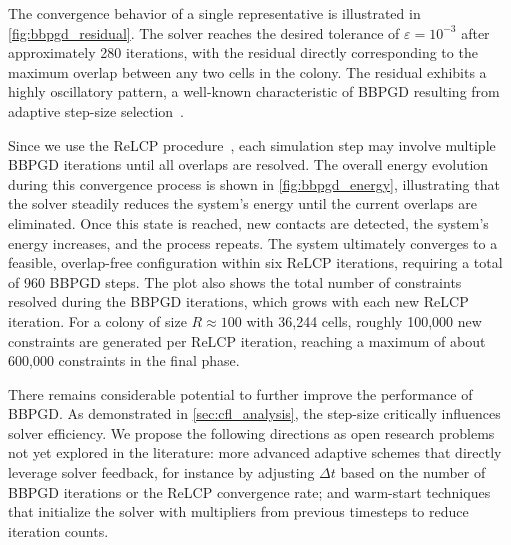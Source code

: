 \documentclass[a4paper,fleqn]{cas-dc}
\providecommand{\DIFaddtex}[1]{\highLight[diffaddbg]{#1}} %
\providecommand{\DIFdeltex}[1]{\highLight[diffdelbg]{\textcolor{diffdelfg}{\strikeThrough{#1}}}} %
\providecommand{\DIFaddbegin}{} %
\providecommand{\DIFaddend}{} %
\providecommand{\DIFdelbegin}{} %
\providecommand{\DIFdelend}{} %
\providecommand{\DIFaddtex}[1]{\texorpdfstring{\DIFaddtex{#1}}{#1}} %
\providecommand{\DIFdeltex}[1]{\texorpdfstring{\DIFdeltex{#1}}{}} %
\providecommand{\DIFadd}[1]{\texorpdfstring{\DIFaddtex{#1}}{#1}} %
\providecommand{\DIFdel}[1]{\texorpdfstring{\DIFdeltex{#1}}{}} %
\newcommand{\DIFscaledelfig}{0.5}
\newlength{\DIFdelgraphicswidth} %
\newlength{\DIFdelgraphicsheight} %
\newcommand{\DIFaddincludegraphics}[2][]{{\color{blue}\fbox{\DIFOincludegraphics[#1]{#2}}}} %
\newcommand{\DIFdelincludegraphics}[2][]{%
\sbox{\DIFdelgraphicsbox}{\DIFOincludegraphics[#1]{#2}}%
\settoboxwidth{\DIFdelgraphicswidth}{\DIFdelgraphicsbox} %
\settoboxtotalheight{\DIFdelgraphicsheight}{\DIFdelgraphicsbox} %
\scalebox{\DIFscaledelfig}{%
\parbox[b]{\DIFdelgraphicswidth}{\usebox{\DIFdelgraphicsbox}\\[-\baselineskip] \rule{\DIFdelgraphicswidth}{0em}}\llap{\resizebox{\DIFdelgraphicswidth}{\DIFdelgraphicsheight}{%
\setlength{\unitlength}{\DIFdelgraphicswidth}%
\begin{picture}(1,1)%
\thicklines\linethickness{2pt} %
{\color[rgb]{1,0,0}\put(0,0){\framebox(1,1){}}}%
{\color[rgb]{1,0,0}\put(0,0){\line( 1,1){1}}}%
{\color[rgb]{1,0,0}\put(0,1){\line(1,-1){1}}}%
\end{picture}%
}\hspace*{3pt}}} %
} %
\DeclareRobustCommand{\DIFaddbegin}{\DIFOaddbegin \let\includegraphics\DIFaddincludegraphics} %
\DeclareRobustCommand{\DIFaddend}{\DIFOaddend \let\includegraphics\DIFOincludegraphics} %
\DeclareRobustCommand{\DIFdelbegin}{\DIFOdelbegin \let\includegraphics\DIFdelincludegraphics} %
\DeclareRobustCommand{\DIFdelend}{\DIFOaddend \let\includegraphics\DIFOincludegraphics} %
\begin{document}
The convergence behavior of a single representative \DIFdelbegin \DIFdel{time step }\DIFdelend \DIFaddbegin \DIFadd{timestep }\DIFaddend is illustrated in \autoref{fig:bbpgd_residual}. The solver reaches the desired tolerance of $\varepsilon = 10^{-3}$ after approximately 280 iterations, with the residual directly corresponding to the maximum overlap between any two cells in the colony. The residual exhibits a highly oscillatory pattern, a well-known characteristic of BBPGD resulting from adaptive step-size selection~\cite{BBPGD,Schneider2021}.

Since we use the ReLCP procedure~\cite{Weady2024SM}, each simulation step may involve multiple BBPGD iterations until all overlaps are resolved. The overall energy evolution during this convergence process is shown in \autoref{fig:bbpgd_energy}, illustrating that the solver steadily reduces the system's energy until the current overlaps are eliminated. Once this state is reached, new contacts are detected, the system's energy increases, and the process repeats. The system ultimately converges to a feasible, overlap-free configuration within six ReLCP iterations, requiring a total of 960 BBPGD steps. The plot also shows the total number of constraints resolved during the BBPGD iterations, which grows with each new ReLCP iteration. For a colony of size $R \approx 100$ with 36,244 cells, roughly 100,000 new constraints are generated per ReLCP iteration, reaching a maximum of about 600,000 constraints in the final phase.

There remains considerable potential to further improve the performance of BBPGD. As demonstrated in \autoref{sec:cfl_analysis}, the step-size critically influences solver efficiency. We propose the following directions as open research problems not yet explored in the literature: more advanced adaptive schemes that directly leverage solver feedback, for instance by adjusting $\Delta t$ based on the number of BBPGD iterations or the ReLCP convergence rate; and warm-start techniques that initialize the solver with multipliers from previous timesteps to reduce iteration counts.
\end{document}
